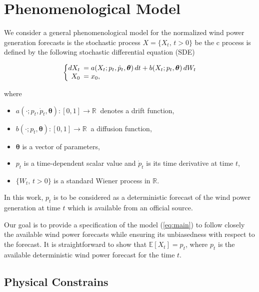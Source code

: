 \documentclass[11pt]{article}
\theoremstyle{definition}
\begin{document}
\section{Phenomenological  Model} \label{Section_2}

We consider a general phenomenological model for the normalized wind power generation forecasts is the stochastic process $X = \{X_t, \, t>0\}$  be the   c process is defined by the following stochastic differential equation (SDE)

\begin{equation}
  \left\{
  \begin{array}{@{}rl@{}}
    dX_t \!\!\!&=  a(X_t; p_t, \dot{p}_t,\bm{\theta}) \,dt + b (X_t; p_t, \bm{\theta} ) \,dW_t  \\
     X_0  \!\!\!&=  x_0,
  \end{array}\right. \label{eq:main}
\end{equation} 

where

\begin{itemize}
\item $a(\cdot; p_t, \dot{p}_t,\bm{\theta}):[0,1] \to \mathbb{R} \ $  denotes a drift function,
\item $b (\cdot;p_t, \bm{\theta} ):[0,1] \to \mathbb{R} \ $  a  diffusion function,
\item $\bm{\theta}$ is a vector of parameters,
\item $p_t$ is a time-dependent scalar value and $ \dot{p}_t$ is its time derivative at time $t$,
\item $\{W_t, \, t >0\}$ is a standard Wiener process in $\mathbb{R}$.
\end{itemize}

In this work, $p_t$ is to be considered as a deterministic forecast of the wind power generation at time $t$ which is available from an official source. 

Our goal is to provide a specification of the model (\ref{eq:main}) to follow closely the available wind power forecasts while ensuring its unbiasedness with respect to the forecast. It is straightforward to show that $\mathbb{E} \left[X_t\right] = p_t$, where $p_t$ is the available deterministic wind power forecast for the time $t$.

\subsection{Physical Constrains}
\end{document}
